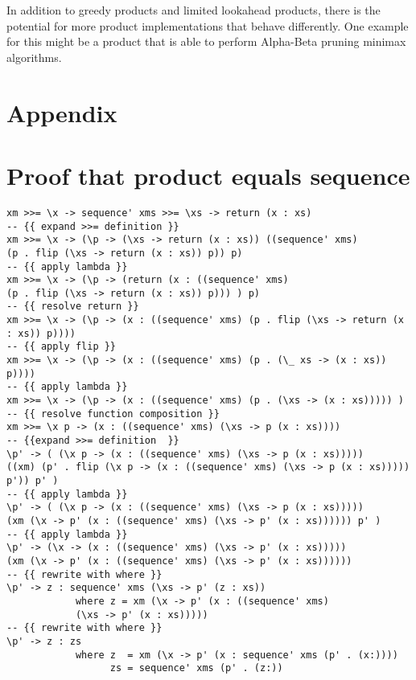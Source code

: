 \documentclass[runningheads]{llncs}
\begin{document}
In addition to greedy products and limited lookahead products, there is the potential for more product implementations that behave differently. One example for this might be a product that is able to perform Alpha-Beta pruning minimax algorithms.

%
%
%
%
%


\newpage
\section*{Appendix}
\appendix
\section{Proof that product equals sequence}
\begin{verbatim}
xm >>= \x -> sequence' xms >>= \xs -> return (x : xs)
-- {{ expand >>= definition }}
xm >>= \x -> (\p -> (\xs -> return (x : xs)) ((sequence' xms) 
(p . flip (\xs -> return (x : xs)) p)) p)
-- {{ apply lambda }}
xm >>= \x -> (\p -> (return (x : ((sequence' xms) 
(p . flip (\xs -> return (x : xs)) p))) ) p)
-- {{ resolve return }}
xm >>= \x -> (\p -> (x : ((sequence' xms) (p . flip (\xs -> return (x : xs)) p))))
-- {{ apply flip }}
xm >>= \x -> (\p -> (x : ((sequence' xms) (p . (\_ xs -> (x : xs)) p))))
-- {{ apply lambda }}
xm >>= \x -> (\p -> (x : ((sequence' xms) (p . (\xs -> (x : xs))))) )
-- {{ resolve function composition }}
xm >>= \x p -> (x : ((sequence' xms) (\xs -> p (x : xs))))
-- {{expand >>= definition  }}                          
\p' -> ( (\x p -> (x : ((sequence' xms) (\xs -> p (x : xs))))) 
((xm) (p' . flip (\x p -> (x : ((sequence' xms) (\xs -> p (x : xs))))) p')) p' )
-- {{ apply lambda }}
\p' -> ( (\x p -> (x : ((sequence' xms) (\xs -> p (x : xs))))) 
(xm (\x -> p' (x : ((sequence' xms) (\xs -> p' (x : xs)))))) p' )
-- {{ apply lambda }}
\p' -> (\x -> (x : ((sequence' xms) (\xs -> p' (x : xs))))) 
(xm (\x -> p' (x : ((sequence' xms) (\xs -> p' (x : xs))))))
-- {{ rewrite with where }}
\p' -> z : sequence' xms (\xs -> p' (z : xs))
            where z = xm (\x -> p' (x : ((sequence' xms) 
            (\xs -> p' (x : xs)))))
-- {{ rewrite with where }}
\p' -> z : zs
            where z  = xm (\x -> p' (x : sequence' xms (p' . (x:))))
                  zs = sequence' xms (p' . (z:))
\end{verbatim}
\end{document}
